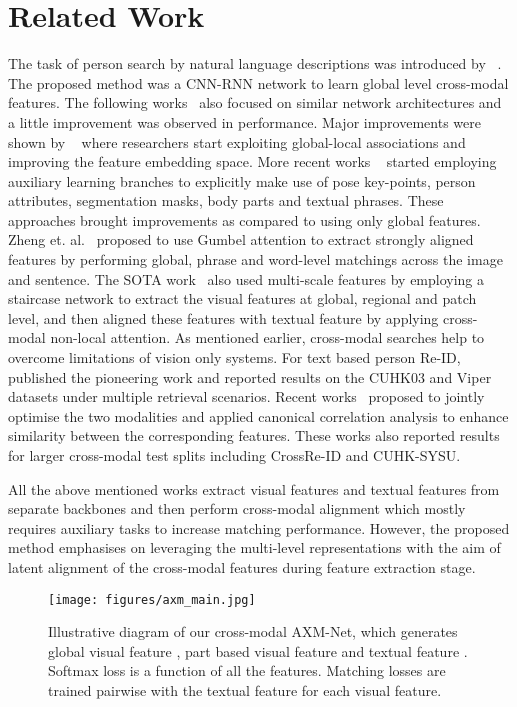 \documentclass[letterpaper]{article} \usepackage{aaai22}  \usepackage{times}  \usepackage{helvet}  \usepackage{courier}  \usepackage[hyphens]{url}  \usepackage{graphicx} \urlstyle{rm} \def\UrlFont{\rm}  \usepackage{natbib}  \usepackage{caption} \DeclareCaptionStyle{ruled}{labelfont=normalfont,labelsep=colon,strut=off} \frenchspacing  \setlength{\pdfpagewidth}{8.5in}  \setlength{\pdfpageheight}{11in}  \usepackage{algorithm}
\begin{document}
\section{Related Work}
The task of person search by natural language descriptions was introduced by ~\cite{li2017person}. The proposed method was a CNN-RNN network to learn global level cross-modal features. The following works~\cite{li2017identity,chen2018Pwm} also focused on similar network architectures and a little improvement was observed in performance. Major improvements were shown by ~\cite{chen2018improving,zhang2018deep,zheng2020dual} where researchers start exploiting global-local associations and improving the feature embedding space. More recent works  ~\cite{jing2020pose,wang2020img,wang2020vitaa,aggarwal2020text} started employing auxiliary learning branches to explicitly make use of pose key-points, person attributes, segmentation masks, body parts and textual phrases. These approaches brought improvements as compared to using only global features. Zheng et. al.~\cite{gumbel2020} proposed to use Gumbel attention to extract strongly aligned features by performing global, phrase and word-level matchings across the image and sentence. The SOTA work~\cite{gao2021contextual} also used multi-scale features by employing a staircase network to extract the visual features at global, regional and patch level, and then aligned these features with textual feature by applying cross-modal non-local attention. 
As mentioned earlier, cross-modal searches help to overcome limitations of vision only systems. For text based person Re-ID,~\cite{yan2018person} published the pioneering work and reported results on the CUHK03 and Viper datasets under multiple retrieval scenarios. Recent works~\cite{farooq2020convolutional,farooq2020IJCB} proposed to jointly optimise the two modalities and applied canonical correlation analysis to enhance similarity between the corresponding features. These works also reported results for larger cross-modal test splits including CrossRe-ID and CUHK-SYSU.

All the above mentioned works extract visual features and textual features from separate backbones and then perform cross-modal alignment which mostly requires auxiliary tasks to increase matching performance. However, the proposed method emphasises on leveraging the multi-level representations with the aim of latent alignment of the cross-modal features during feature extraction stage.

\begin{figure*}
\centering
        \texttt{[image: figures/axm\_main.jpg]}
        \footnotesize{\caption{Illustrative diagram of our cross-modal AXM-Net, which generates global visual feature , part based visual feature  and textual feature . Softmax loss  is a function of all the features. Matching losses are trained pairwise with the textual feature for each visual feature.}
    \label{block-diagram}}
\end{figure*}
\end{document}
